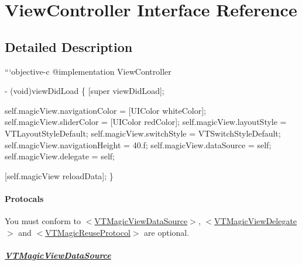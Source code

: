 \hypertarget{interface_view_controller}{}\section{View\+Controller Interface Reference}
\label{interface_view_controller}


\subsection{Detailed Description}

\begin{DoxyCode}
```objective-c
@implementation ViewController

- (void)viewDidLoad
\{
    [super viewDidLoad];

    self.magicView.navigationColor = [UIColor whiteColor];
    self.magicView.sliderColor = [UIColor redColor];
    self.magicView.layoutStyle = VTLayoutStyleDefault;
    self.magicView.switchStyle = VTSwitchStyleDefault;
    self.magicView.navigationHeight = 40.f;
    self.magicView.dataSource = self;
    self.magicView.delegate = self;

    [self.magicView reloadData];
\}
\end{DoxyCode}


\paragraph*{Protocals}

You must conform to {\ttfamily $<$\mbox{\hyperlink{class_v_t_magic_view_data_source-p}{V\+T\+Magic\+View\+Data\+Source}}$>$}, {\ttfamily $<$\mbox{\hyperlink{class_v_t_magic_view_delegate-p}{V\+T\+Magic\+View\+Delegate}}$>$} and {\ttfamily $<$\mbox{\hyperlink{class_v_t_magic_reuse_protocol-p}{V\+T\+Magic\+Reuse\+Protocol}}$>$} are optional.

\subparagraph*{\mbox{\hyperlink{class_v_t_magic_view_data_source-p}{V\+T\+Magic\+View\+Data\+Source}}}


